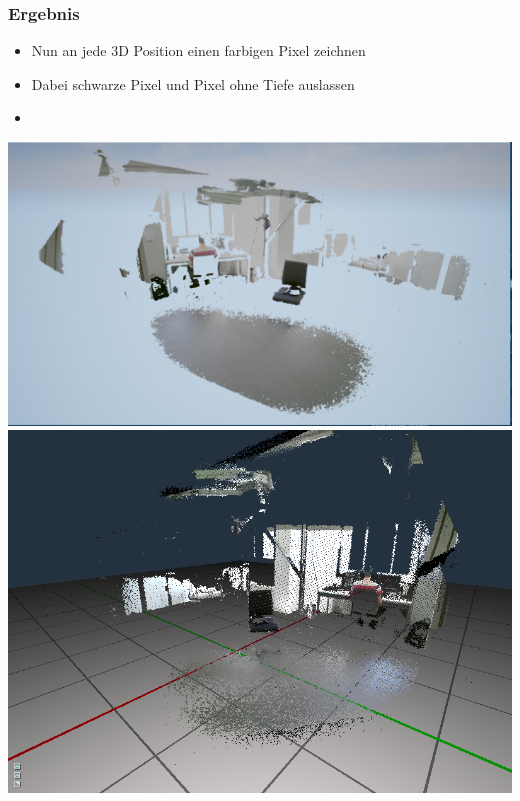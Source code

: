 \documentclass[18pt]{beamer}
\begin{document}
\begin{frame}
	\frametitle{Ergebnis} 
	\begin{itemize}
		\item Nun an jede 3D Position einen farbigen Pixel zeichnen
		\item Dabei schwarze Pixel und Pixel ohne Tiefe auslassen
		\item {}
	\end{itemize}
	\begin{center}
		\includegraphics[height=0.37\paperheight]{img/Cloud}
		\includegraphics[height=0.37\paperheight]{img/CloudPCViewer}
	\end{center}
\end{frame}
\end{document}
